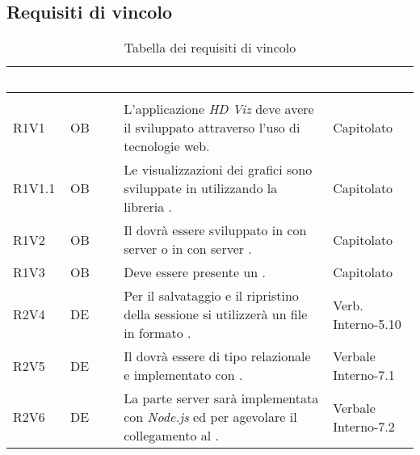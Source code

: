 \subsection{Requisiti di vincolo}
{
\setlength\arrayrulewidth{1pt}
\begin{longtable}{C{2cm} | C{1.5cm} | C{9cm} | C{3.3cm}}
		\textcolor{white}{\textbf{Codice}} & 
		\textcolor{white}{\textbf{Classe}} & 
		\textcolor{white}{\textbf{Descrizione}} & 
		\textcolor{white}{\textbf{Fonti}} \\
		\endfirsthead
	    \\
	    \endfoot
	    \caption{Tabella dei requisiti di vincolo}
	    \endlastfoot

R1V1 & OB & L'applicazione \textit{HD Viz} deve avere il  sviluppato attraverso l'uso di tecnologie web. & Capitolato \\
R1V1.1 & OB & Le visualizzazioni dei grafici sono sviluppate in  utilizzando la libreria . & Capitolato\\
R1V2 & OB & Il  dovrà essere sviluppato in  con server  o in  con server . & Capitolato \\
R1V3 & OB & Deve essere presente un  . & Capitolato\\
R2V4 & DE & Per il salvataggio e il ripristino della sessione si utilizzerà un file in formato . & Verb. Interno-5.10\\
R2V5 & DE & Il  dovrà essere di tipo relazionale e implementato con \textit{}. & Verbale Interno-7.1\\
R2V6 & DE & La parte server sarà implementata con \textit{Node.js} ed \textit{} per agevolare il collegamento al . & Verbale Interno-7.2 \\


\end{longtable}}
